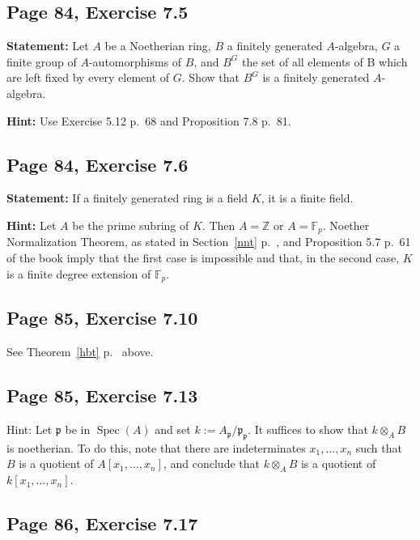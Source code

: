 \documentclass[parskip=half,fontsize=12pt]{scrartcl}%
\newcommand{\mf}{\mathfrak}
\newcommand{\ppp}{\mf p}
\newcommand{\Spec}{\operatorname{Spec}}\newcommand{\Sp}{\operatorname{Spec}}
\begin{document}
\subsection{Page 84, Exercise 7.5}%

\textbf{Statement:} Let $A$ be a Noetherian ring, $B$ a finitely generated $A$-algebra, $G$ a finite group of $A$-automorphisms of $B$, and $B^G$ the set of all elements of B which are left fixed by every element of $G$. Show that $B^G$ is a finitely generated $A$-algebra.

\textbf{Hint:} Use Exercise 5.12 p.~68 and Proposition 7.8 p.~81.

\subsection{Page 84, Exercise 7.6}%

\textbf{Statement:} If a finitely generated ring is a field $K$, it is a finite field.

\textbf{Hint:} Let $A$ be the prime subring of $K$. Then $A=\mathbb Z$ or $A=\mathbb F_p$. Noether Normalization Theorem, as stated in Section~\ref{nnt} p.~\pageref{nnt}, and Proposition 5.7 p.~61 of the book imply that the first case is impossible and that, in the second case, $K$ is a finite degree extension of $\mathbb F_p$. %

\subsection{Page 85, Exercise 7.10}%

See Theorem~\ref{hbt} p.~\pageref{hbt} above.

\subsection{Page 85, Exercise 7.13}%

Hint: Let $\ppp$ be in $\Spec(A)$ and set $k:=A_\ppp/\ppp_\ppp$. It suffices to show that $k\otimes_AB$ is noetherian. To do this, note that there are indeterminates $x_1,\dots,x_n$ such that $B$ is a quotient of $A[x_1,\dots,x_n]$, and conclude that $k\otimes_AB$ is a quotient of $k[x_1,\dots,x_n]$. 

\subsection{Page 86, Exercise 7.17}%
\end{document}
